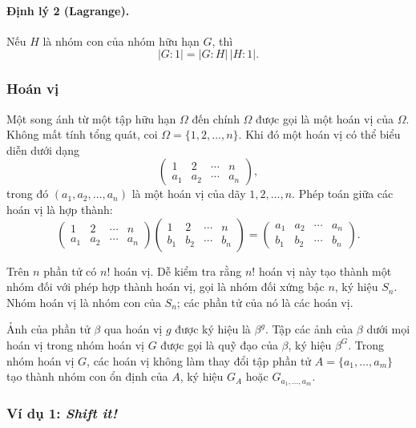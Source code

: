 \documentclass[11pt]{article}
\begin{document}
\paragraph{Định lý 2 (Lagrange).}
Nếu \(H\) là nhóm con của nhóm hữu hạn \(G\), thì
\[
  |G:1|=|G:H|\,|H:1|.
\]

\subsubsection{Hoán vị}

Một song ánh từ một tập hữu hạn \(\Omega\) đến chính \(\Omega\) được gọi là một
hoán vị của \(\Omega\). Không mất tính tổng quát, coi
\(\Omega=\{1,2,\ldots,n\}\). Khi đó một hoán vị có thể biểu diễn dưới dạng
\[
  \begin{pmatrix}
  1 & 2 & \cdots & n\\
  a_1 & a_2 & \cdots & a_n
  \end{pmatrix},
\]
trong đó \((a_1,a_2,\ldots,a_n)\) là một hoán vị của dãy \(1,2,\ldots,n\). Phép
toán giữa các hoán vị là hợp thành:
\[
  \begin{pmatrix}
  1 & 2 & \cdots & n\\
  a_1 & a_2 & \cdots & a_n
  \end{pmatrix}
  \begin{pmatrix}
  1 & 2 & \cdots & n\\
  b_1 & b_2 & \cdots & b_n
  \end{pmatrix}
  =
  \begin{pmatrix}
  a_1 & a_2 & \cdots & a_n\\
  b_1 & b_2 & \cdots & b_n
  \end{pmatrix}.
\]

Trên \(n\) phần tử có \(n!\) hoán vị. Dễ kiểm tra rằng \(n!\) hoán vị này tạo
thành một nhóm đối với phép hợp thành hoán vị, gọi là nhóm đối xứng bậc \(n\),
ký hiệu \(S_n\). Nhóm hoán vị là nhóm con của \(S_n\); các phần tử của nó là
các hoán vị.

Ảnh của phần tử \(\beta\) qua hoán vị \(g\) được ký hiệu là \(\beta^g\). Tập
các ảnh của \(\beta\) dưới mọi hoán vị trong nhóm hoán vị \(G\) được gọi là
quỹ đạo của \(\beta\), ký hiệu \(\beta^G\). Trong nhóm hoán vị \(G\), các hoán
vị không làm thay đổi tập phần tử \(A=\{a_1,\ldots,a_m\}\) tạo thành nhóm con
ổn định của \(A\), ký hiệu \(G_A\) hoặc \(G_{a_1,\ldots,a_m}\).

\subsubsection{Ví dụ 1: \emph{Shift it!}}
\end{document}
